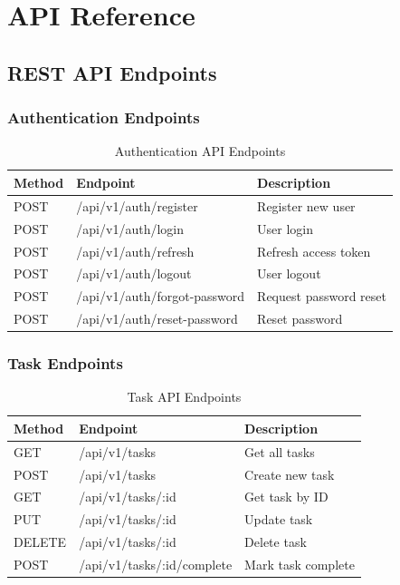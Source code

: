 \chapter{API Reference}
\label{appendix:api-reference}

\section{REST API Endpoints}

\subsection{Authentication Endpoints}

\begin{table}[H]
\centering
\caption{Authentication API Endpoints}
\begin{tabular}{|l|l|p{6cm}|}
\hline
\rowcolor{lightgray}
\textbf{Method} & \textbf{Endpoint} & \textbf{Description} \\
\hline
POST & /api/v1/auth/register & Register new user \\
\hline
POST & /api/v1/auth/login & User login \\
\hline
POST & /api/v1/auth/refresh & Refresh access token \\
\hline
POST & /api/v1/auth/logout & User logout \\
\hline
POST & /api/v1/auth/forgot-password & Request password reset \\
\hline
POST & /api/v1/auth/reset-password & Reset password \\
\hline
\end{tabular}
\end{table}

\subsection{Task Endpoints}

\begin{table}[H]
\centering
\caption{Task API Endpoints}
\begin{tabular}{|l|l|p{6cm}|}
\hline
\rowcolor{lightgray}
\textbf{Method} & \textbf{Endpoint} & \textbf{Description} \\
\hline
GET & /api/v1/tasks & Get all tasks \\
\hline
POST & /api/v1/tasks & Create new task \\
\hline
GET & /api/v1/tasks/:id & Get task by ID \\
\hline
PUT & /api/v1/tasks/:id & Update task \\
\hline
DELETE & /api/v1/tasks/:id & Delete task \\
\hline
POST & /api/v1/tasks/:id/complete & Mark task complete \\
\hline
\end{tabular}
\end{table}

